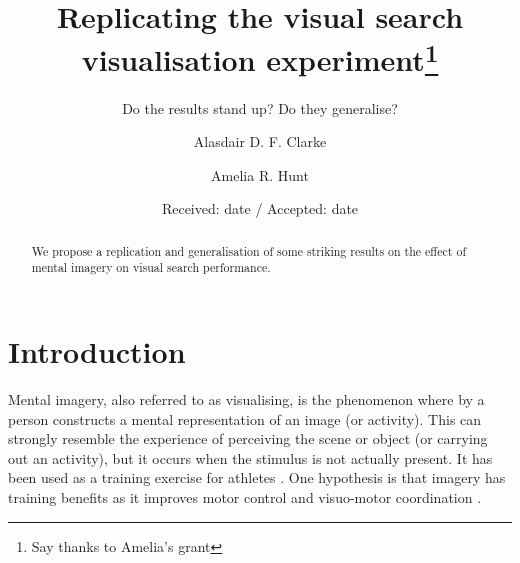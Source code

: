 \documentclass[smallextended]{svjour3}       %
\begin{document}
\title{Replicating the visual search visualisation experiment\thanks{Say thanks to Amelia's grant}}
\subtitle{Do the results stand up? Do they generalise?}


\author{Alasdair D. F. Clarke         \and
        Amelia R. Hunt
}



\date{Received: date / Accepted: date}


\maketitle

\begin{abstract}
We propose a replication and generalisation of some striking results on the effect of mental imagery on visual search performance. 
\end{abstract}

\section{Introduction}
\label{sec:intro}

Mental imagery, also referred to as visualising, is the phenomenon where by a person constructs a mental representation of an image (or activity). This can strongly resemble the experience of perceiving the scene or object (or carrying out an activity), but it occurs when the stimulus is not actually present. It has been used as a training exercise for athletes \citep{??}. One hypothesis is that imagery has training benefits as it improves motor control \citep{crammond1997} and visuo-motor coordination \citep{binder2014}.
\end{document}
